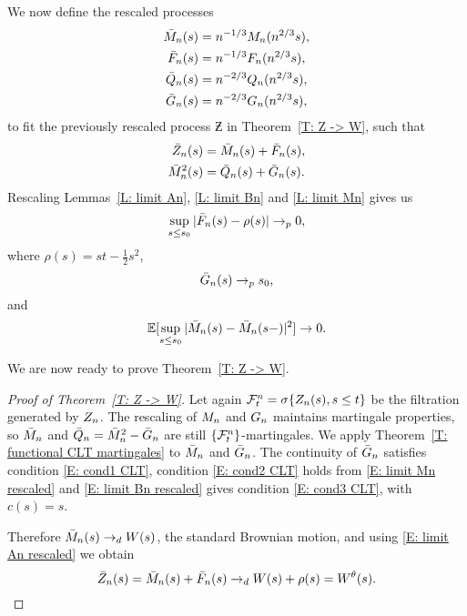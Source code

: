 We now define the rescaled processes 
\begin{equation}
\begin{aligned}
\bar{M}_n(s) &= n^{-1 / 3}M_n(n^{2 / 3}s), \\
\bar{F}_n(s) &= n^{-1 / 3}F_n(n^{2 / 3}s), \\
\bar{Q}_n(s) &= n^{-2 / 3}Q_n(n^{2 / 3}s), \\
\bar{G}_n(s) &= n^{-2 / 3}G_n(n^{2 / 3}s),
\end{aligned} 	
\end{equation}
to fit the previously rescaled process 
$\Zbar$ in Theorem~\ref{T: Z -> W}, such that
\begin{equation}
\begin{aligned}
\bar{Z}_n(s) &= \bar{M}_n(s) + \bar{F}_n(s), \\
\bar{M}_n^2(s) &= \bar{Q}_n(s) + \bar{G}_n(s).
\end{aligned}	
\end{equation}
Rescaling Lemmas~\ref{L: limit An}, \ref{L: limit Bn} and \ref{L: limit Mn} gives us
\begin{equation} \label{E: limit An rescaled}
\sup_{s \leq s_0} |\bar{F}_n(s) - \rho (s)| \rightarrow_p 0,
\end{equation}
where $\rho (s) = st - \frac{1}{2}s^2$,
\begin{equation} \label{E: limit Bn rescaled}
\bar{G}_n(s) \rightarrow_p s_0,
\end{equation}
and
\begin{equation} \label{E: limit Mn rescaled}
\mathbb{E}[\sup_{s \leq s_0} | \bar{M}_n(s) - \bar{M}_n(s-) |^2 ] \rightarrow 0.
\end{equation}

We are now ready to prove Theorem~\ref{T: Z -> W}.

\begin{proof}[Proof of Theorem~\ref{T: Z -> W}]
	Let again $\mathcal{F}^n_{t} = \sigma \{ Z_n(s), s \leq t \}$ be the filtration generated by $Z_n$.
	The rescaling of $M_n$ and $G_n$ maintains martingale properties,
	so $\bar{M}_n$ and $\bar{Q}_n = \bar{M}_n^2 - \bar{G}_n$ are still $\{\mathcal{F}^n_{t}\}$-martingales.
	We apply Theorem~\ref{T: functional CLT martingales} to $\bar{M}_n$ and $\bar{G}_n$.
	The continuity of $\bar{G}_n$ satisfies condition \eqref{E: cond1 CLT}, 
	condition \eqref{E: cond2 CLT} holds from \eqref{E: limit Mn rescaled}
	and \eqref{E: limit Bn rescaled} gives condition \eqref{E: cond3 CLT}, with $c(s) = s$.
	
	Therefore $\bar{M}_n(s) \rightarrow_d W(s)$, the standard Brownian motion, and using \eqref{E: limit An rescaled} we obtain
	\begin{equation}
	\bar{Z}_n(s) = \bar{M}_n(s) + \bar{F}_n(s) \rightarrow_d W(s) + \rho (s) = W^{\theta}(s).
	\end{equation}
\end{proof}



